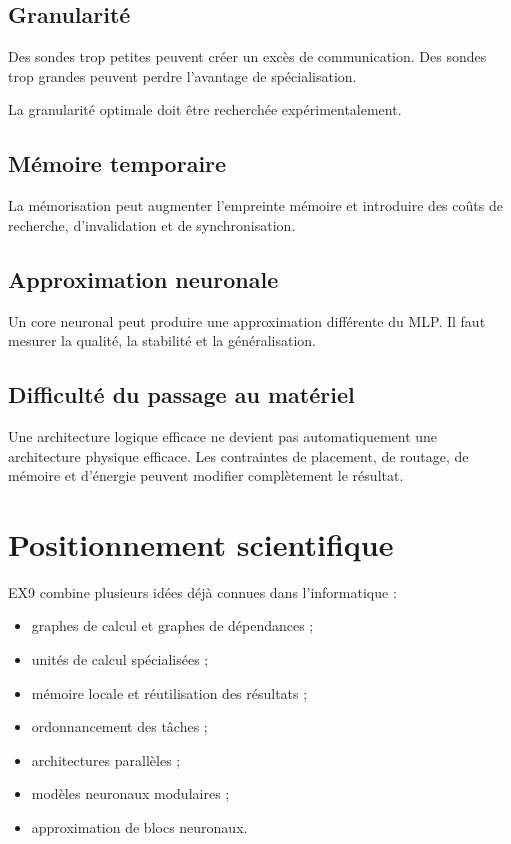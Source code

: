 \documentclass[11pt,a4paper]{article}
\begin{document}
\subsection{Granularité}

Des sondes trop petites peuvent créer un excès de communication.
Des sondes trop grandes peuvent perdre l'avantage de spécialisation.

La granularité optimale doit être recherchée expérimentalement.

\subsection{Mémoire temporaire}

La mémorisation peut augmenter l'empreinte mémoire et introduire
des coûts de recherche, d'invalidation et de synchronisation.

\subsection{Approximation neuronale}

Un core neuronal peut produire une approximation différente du MLP.
Il faut mesurer la qualité, la stabilité et la généralisation.

\subsection{Difficulté du passage au matériel}

Une architecture logique efficace ne devient pas automatiquement
une architecture physique efficace. Les contraintes de placement,
de routage, de mémoire et d'énergie peuvent modifier complètement
le résultat.

\section{Positionnement scientifique}

EX9 combine plusieurs idées déjà connues dans l'informatique :
\begin{itemize}
  \item graphes de calcul et graphes de dépendances ;
  \item unités de calcul spécialisées ;
  \item mémoire locale et réutilisation des résultats ;
  \item ordonnancement des tâches ;
  \item architectures parallèles ;
  \item modèles neuronaux modulaires ;
  \item approximation de blocs neuronaux.
\end{itemize}
\end{document}
